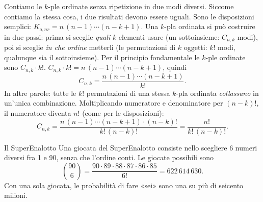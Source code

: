 
\begin{dimostrazione}
 Contiamo le $k$-ple ordinate senza ripetizione in due modi diversi. Siccome contiamo la stessa cosa, i
due risultati devono essere uguali.
 Sono le disposizioni semplici: $K_{o,nr} = n\,(n-1) \cdots (n-k+1)$.
 Una $k$-pla ordinata si può costruire in due passi: prima si sceglie \emph{quali} $k$ elementi
usare (un sottoinsieme: $C_{n,k}$ modi), poi si sceglie \emph{in che ordine} metterli (le permutazioni di $k$
oggetti: $k!$ modi, qualunque sia il sottoinsieme). Per il principio fondamentale le $k$-ple ordinate sono
$C_{n,k} \cdot k!$.
 $C_{n,k} \cdot k! = n\,(n-1) \cdots (n-k+1)$, quindi
\[ C_{n,k} = \frac{n\,(n-1) \cdots (n-k+1)}{k!} . \]
In altre parole: tutte le $k!$ permutazioni di una stessa $k$-pla ordinata \emph{collassano} in un'unica
combinazione.
 Moltiplicando numeratore e denominatore per $(n-k)!$, il numeratore diventa $n!$
(come per le disposizioni):
\[ C_{n,k} = \frac{n\,(n-1) \cdots (n-k+1) \cdot (n-k)!}{k!\,(n-k)!} = \frac{n!}{k!\,(n-k)!} . \]
\end{dimostrazione}

\begin{esempio}{Il SuperEnalotto}
Una giocata del SuperEnalotto consiste nello scegliere 6 numeri diversi fra 1 e 90, senza che l'ordine conti. Le
giocate possibili sono
\[ \binom{90}{6} = \frac{90 \cdot 89 \cdot 88 \cdot 87 \cdot 86 \cdot 85}{6!} = 622\,614\,630 . \]
Con una sola giocata, le probabilità di fare «sei» sono una su più di seicento milioni.
\end{esempio}

